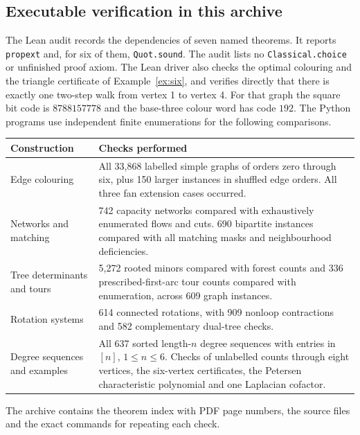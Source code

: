 \clearpage\subsection*{Executable verification in this archive}
The Lean audit records the dependencies of seven named theorems. It reports
\texttt{propext} and, for six of them, \texttt{Quot.sound}. The audit lists
no \texttt{Classical.choice} or unfinished proof axiom. The Lean driver also checks the optimal colouring and the triangle certificate of Example~\ref{ex:six}, and verifies directly that there is exactly one two-step walk from vertex 1 to vertex 4. For that graph the square bit code is $8788157778$ and the base-three colour word has code $192$. The Python programs
use independent finite enumerations for the following comparisons.

\noindent\begin{tabularx}{\linewidth}{@{}>{\raggedright\arraybackslash}p{.22\linewidth}X@{}}
\toprule
Construction & Checks performed\\ \midrule
Edge colouring & All 33,868 labelled simple graphs of orders zero through six,
plus 150 larger instances in shuffled edge orders. All three fan extension
cases occurred.\\[3pt]
Networks and matching & 742 capacity networks compared with exhaustively
enumerated flows and cuts. 690 bipartite instances compared with all matching
masks and neighbourhood deficiencies.\\[3pt]
Tree determinants and tours & 5,272 rooted minors compared with forest counts
and 336 prescribed-first-arc tour counts compared with enumeration, across
609 graph instances.\\[3pt]
Rotation systems & 614 connected rotations, with 909 nonloop contractions
and 582 complementary dual-tree checks.\\[3pt]
Degree sequences and examples & All 637 sorted length-$n$ degree sequences
with entries in $[n]$, $1\le n\le6$. Checks of unlabelled counts through eight
vertices, the six-vertex certificates, the Petersen characteristic polynomial
and one Laplacian cofactor.\\ \bottomrule
\end{tabularx}

The archive contains the theorem index with PDF page numbers, the source
files and the exact commands for repeating each check.
